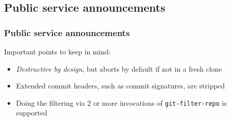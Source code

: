 \documentclass[compress,t,aspectratio=169]{beamer}
\begin{document}
\subsection{Public service announcements}

\begin{frame}
  \frametitle{Public service announcements}

  Important points to keep in mind:

  \begin{itemize}[<+->]
    \item \textit{Destructive by design}, but aborts by default if not in a
          fresh clone
    \item Extended commit headers, such as commit signatures, are stripped
    \item Doing the filtering via 2 or more invocations of
          \texttt{git-filter-repo} is supported
  \end{itemize}

\end{frame}
\end{document}
